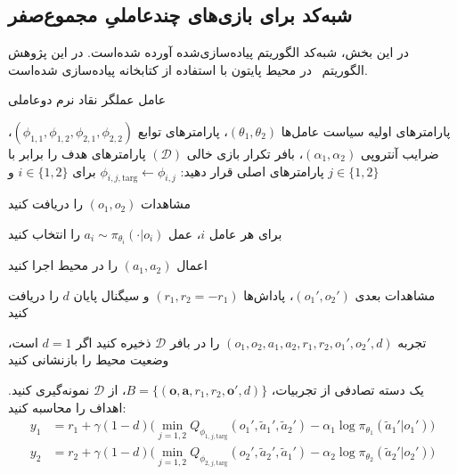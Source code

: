 \subsection{شبه‌کد  برای بازی‌های چندعاملیِ مجموع­‌صفر}

در این بخش، شبه‌کد الگوریتم  پیاده‌سازی‌شده آورده شده‌است. در این پژوهش الگوریتم~ در محیط پایتون با استفاده از کتابخانه  \cite{paszke2017automatic} پیاده‌سازی شده‌است.

\begin{algorithm}[H]
    \caption{عامل عملگر نقاد نرم دو­عاملی}\label{alg:MA-SAC}
    \begin{algorithmic}[1]
         پارامترهای اولیه سیاست عامل‌ها $(\theta_1, \theta_2)$، پارامترهای توابع  $(\phi_{1,1}, \phi_{1,2}, \phi_{2,1}, \phi_{2,2})$، ضرایب آنتروپی $(\alpha_1, \alpha_2)$، بافر تکرار بازی خالی $(\mathcal{D})$
        \State پارامترهای هدف را برابر با پارامترهای اصلی قرار دهید: 
        \Statex \hspace{\algorithmicindent}
        $\phi_{i,j,\text{targ}} \leftarrow \phi_{i,j}$ برای $i \in \{1, 2\}$ و $j \in \{1, 2\}$
        
            \State \parbox[t]{\dimexpr\linewidth-\algorithmicindent}{
            مشاهدات $(o_1, o_2)$ را دریافت کنید
            \strut}
            \State \parbox[t]{\dimexpr\linewidth-\algorithmicindent}{
            برای هر عامل $i$، عمل $a_i \sim \pi_{\theta_i}(\cdot|o_i)$ را انتخاب کنید
            \strut}
            \State اعمال $(a_1, a_2)$ را در محیط اجرا کنید
            \State \parbox[t]{\dimexpr\linewidth-\algorithmicindent}{
            مشاهدات بعدی $(o_1', o_2')$، پاداش‌ها $(r_1, r_2=-r_1)$ و سیگنال پایان $d$ را دریافت کنید
            \strut}
            \State تجربه $(o_1, o_2, a_1, a_2, r_1, r_2, o_1', o_2', d)$ را در بافر $\mathcal{D}$ ذخیره کنید
            \State اگر $d=1$ است، وضعیت محیط را بازنشانی کنید
            
                    \State %
                    یک دسته تصادفی از تجربیات، $B = \{(\boldsymbol{o}, \boldsymbol{a}, r_1, r_2, \boldsymbol{o}', d)\}$، از $\mathcal{D}$ نمونه‌گیری کنید.
                    \State اهداف را محاسبه کنید:
                     \vspace{-15pt}
                    \begin{align*}
                        y_1 &= r_1 + \gamma (1-d) \Big(\min_{j=1,2} Q_{\phi_{1,j,\text{targ}}}(o_1', \tilde{a}_1', \tilde{a}_2') - \alpha_1 \log \pi_{\theta_1}(\tilde{a}_1'|o_1') \Big) \\
                        y_2 &= r_2 + \gamma (1-d) \Big(\min_{j=1,2} Q_{\phi_{2,j,\text{targ}}}(o_2', \tilde{a}_2', \tilde{a}_1') - \alpha_2 \log \pi_{\theta_2}(\tilde{a}_2'|o_2') \Big)
                    \end{align*}
                    \vspace{-35pt}
                    

\end{algorithmic}
\end{algorithm}
